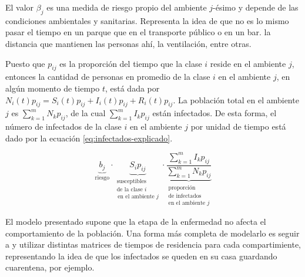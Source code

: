 El valor \(\beta_j\) es una medida de riesgo propio del ambiente \(j\)-ésimo y depende de las condiciones ambientales y sanitarias. Representa la idea de que no es lo mismo pasar el tiempo en un parque que en el transporte público o en un bar.  la distancia que mantienen las personas ahí, la ventilación, entre otras.

Puesto que \(p_{ij}\) es la proporción del tiempo que la clase \(i\) reside en el ambiente \(j\), entonces la cantidad de personas en promedio de la clase \(i\) en el ambiente \(j\), en algún momento de tiempo \(t\), está dada por \(N_i(t) p_{ij} = S_i(t) p_{ij} + I_i(t) p_{ij} + R_i(t) p_{ij}\). La población total en el ambiente \(j\) es \(\sum_{k = 1}^m N_k p_{ij}\), de la cual \(\sum_{k = 1}^m I_k p_{ij}\) están infectados. De esta forma, el número de infectados de la clase \(i\) en el ambiente \(j\) por unidad de tiempo está dado por la ecuación \ref{eq:infectados-explicado}.

\begin{equation}\label{eq:infectados-explicado}
\underbrace{b_j}_{\text{riesgo}} \cdot \underbrace{S_i p_{ij}}_{\substack{\text{susceptibles}\\\text{de la clase } i\\ \, \text{en el ambiente } j}} \cdot \underbrace{\frac{\sum_{k = 1}^m I_k p_{ij}}{\sum_{k = 1}^m N_k p_{ij}}}_{\substack{\text{proporción}\\\text{de infectados}\\\text{en el ambiente }j}}
\end{equation}


El modelo presentado supone que la etapa de la enfermedad no afecta el comportamiento de la población. Una forma más completa de modelarlo es seguir a \cite{Bichara2018} y utilizar distintas matrices de tiempos de residencia para cada compartimiente, representando la idea de que los infectados se queden en su casa guardando cuarentena, por ejemplo.




